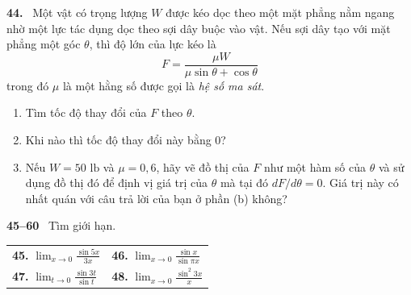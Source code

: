 \begin{minipage}[t]{0.485\textwidth}
\textbf{44.} \ Một vật có trọng lượng $W$ được kéo dọc theo một mặt phẳng nằm ngang nhờ một lực tác dụng dọc theo sợi dây buộc vào vật. Nếu sợi dây tạo với mặt phẳng một góc $\theta$, thì độ lớn của lực kéo là
\[
F = \frac{\mu W}{\mu \sin \theta + \cos \theta}
\]
trong đó $\mu$ là một hằng số được gọi là \emph{hệ số ma sát}.
\begin{enumerate}[label=\textbf{(\alph*)}, leftmargin=6mm, itemsep=0.8mm, topsep=1mm]
  \item Tìm tốc độ thay đổi của $F$ theo $\theta$.
  \item Khi nào thì tốc độ thay đổi này bằng $0$?
  \item[\llap{\casicon\hspace{1.5mm}}\textbf{(c)}] Nếu $W = 50\text{ lb}$ và $\mu = 0{,}6$, hãy vẽ đồ thị của $F$ như một hàm số của $\theta$ và sử dụng đồ thị đó để định vị giá trị của $\theta$ mà tại đó $dF/d\theta = 0$. Giá trị này có nhất quán với câu trả lời của bạn ở phần (b) không?
\end{enumerate}\par\vspace{3mm}

{\color{stewartcyan}\textbf{45--60}} \ Tìm giới hạn.\par\vspace{2.5mm}

\noindent
\begin{tabularx}{\linewidth}{@{}X X@{}}
\textbf{45.} $\displaystyle \lim_{x \to 0} \frac{\sin 5x}{3x}$ & \textbf{46.} $\displaystyle \lim_{x \to 0} \frac{\sin x}{\sin \pi x}$ \\[3.8ex]
\textbf{47.} $\displaystyle \lim_{t \to 0} \frac{\sin 3t}{\sin t}$ & \textbf{48.} $\displaystyle \lim_{x \to 0} \frac{\sin^2 3x}{x}$
\end{tabularx}

\end{minipage}
